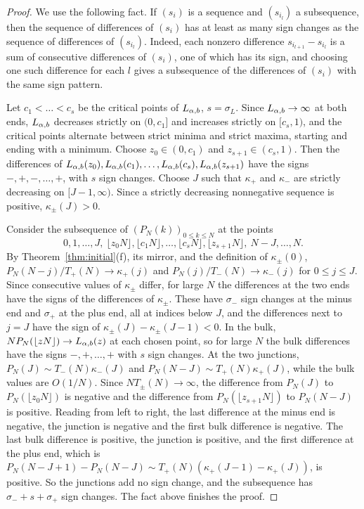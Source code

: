 \begin{proof}
We use the following fact. If $(s_i)$ is a sequence and $(s_{i_l})$ a subsequence, then
the sequence of differences of $(s_i)$ has at least as many sign changes as the sequence
of differences of $(s_{i_l})$. Indeed, each nonzero difference $s_{i_{l+1}}-s_{i_l}$ is a
sum of consecutive differences of $(s_i)$, one of which has its sign, and choosing one
such difference for each $l$ gives a subsequence of the differences of $(s_i)$ with the
same sign pattern.

Let $c_1<\dots<c_s$ be the critical points of $L_{\alpha,b}$, $s=\sigma_L$. Since $L_{\alpha,b}\to\infty$ at
both ends, $L_{\alpha,b}$ decreases strictly on $(0,c_1]$ and increases strictly on $[c_s,1)$, and
the critical points alternate between strict minima and strict maxima, starting and ending
with a minimum. Choose $z_0\in(0,c_1)$ and $z_{s+1}\in(c_s,1)$. Then the differences of
$L_{\alpha,b}(z_0),L_{\alpha,b}(c_1),\dots,L_{\alpha,b}(c_s),L_{\alpha,b}(z_{s+1})$ have the signs $-,+,-,\dots,+$, with $s$
sign changes. Choose $J$ such that $\kappa_\plus$ and $\kappa_\minus$ are strictly
decreasing on $[J-1,\infty)$. Since a strictly decreasing nonnegative sequence is positive,
$\kappa_\pm(J)>0$.

Consider the subsequence of $(P_N(k))_{0\le k\le N}$ at the points
\[
 0,1,\dots,J,\ \lfloor z_0N\rfloor,\lfloor c_1N\rfloor,\dots,\lfloor c_sN\rfloor,\lfloor z_{s+1}N\rfloor,\ N-J,\dots,N .
\]
By Theorem~\ref{thm:initial}(f), its mirror, and the definition of $\kappa_\pm(0)$,
$P_N(N-j)/T_\plus(N)\to\kappa_\plus(j)$ and $P_N(j)/T_\minus(N)\to\kappa_\minus(j)$ for
$0\le j\le J$. Since consecutive values of $\kappa_\pm$ differ, for large $N$ the
differences at the two ends have the signs of the differences of $\kappa_\pm$. These have
$\sigma_\minus$ sign changes at the minus end and $\sigma_\plus$ at the plus end, all at
indices below $J$, and the differences next to $j=J$ have the sign of
$\kappa_\pm(J)-\kappa_\pm(J-1)<0$. In the bulk, $NP_N(\lfloor zN\rfloor)\to L_{\alpha,b}(z)$ at each
chosen point, so for large $N$ the bulk differences have the signs $-,+,\dots,+$ with $s$
sign changes. At the two junctions, $P_N(J)\sim T_\minus(N)\kappa_\minus(J)$ and
$P_N(N-J)\sim T_\plus(N)\kappa_\plus(J)$, while the bulk values are $O(1/N)$. Since
$NT_\pm(N)\to\infty$, the difference from $P_N(J)$ to $P_N(\lfloor z_0N\rfloor)$ is negative
and the difference from $P_N(\lfloor z_{s+1}N\rfloor)$ to $P_N(N-J)$ is positive. Reading
from left to right, the last difference at the minus end is negative, the junction is
negative and the first bulk difference is negative. The last bulk difference is positive,
the junction is positive, and the first difference at the plus end, which is
$P_N(N-J+1)-P_N(N-J)\sim T_\plus(N)(\kappa_\plus(J-1)-\kappa_\plus(J))$, is positive. So the
junctions add no sign change, and the subsequence has $\sigma_\minus+s+\sigma_\plus$ sign
changes. The fact above finishes the proof.
\end{proof}


